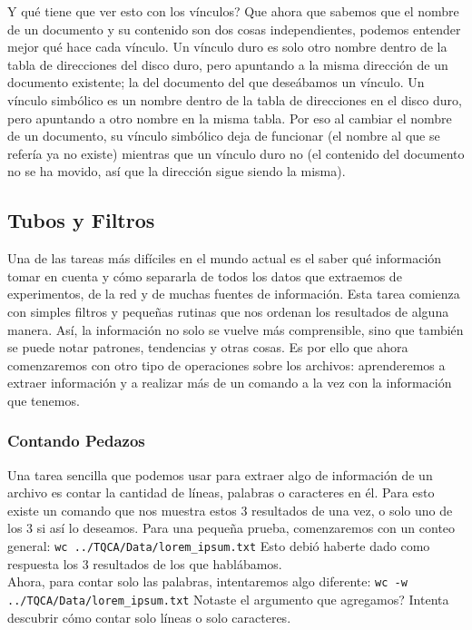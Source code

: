 \documentclass[10pt,letterpaper]{article}
\newcommand{\inlinecode}[1]{
\colorbox{light-gray}{\texttt{#1}}
}
\begin{document}
Y qu\'e tiene que ver esto con los v\'inculos? Que ahora que sabemos que el nombre de un documento y su contenido son dos cosas independientes, podemos entender mejor qu\'e hace cada v\'inculo. Un v\'inculo duro es solo otro nombre dentro de la tabla de direcciones del disco duro, pero apuntando a la misma direcci\'on de un documento existente; la del documento del que dese\'abamos un v\'inculo. Un v\'inculo simb\'olico es un nombre dentro de la tabla de direcciones en el disco duro, pero apuntando a otro nombre en la misma tabla. Por eso al cambiar el nombre de un documento, su v\'inculo simb\'olico deja de funcionar (el nombre al que se refer\'ia ya no existe) mientras que un v\'inculo duro no (el contenido del documento no se ha movido, as\'i que la direcci\'on sigue siendo la misma).

\subsection{Tubos y Filtros}
Una de las tareas m\'as dif\'iciles en el mundo actual es el saber qu\'e informaci\'on tomar en cuenta y c\'omo separarla de todos los datos que extraemos de experimentos, de la red y de muchas fuentes de informaci\'on. Esta tarea comienza con simples filtros y peque\~nas rutinas que nos ordenan los resultados de alguna manera. As\'i, la informaci\'on no solo se vuelve m\'as comprensible, sino que tambi\'en se puede notar patrones, tendencias y otras cosas. Es por ello que ahora comenzaremos con otro tipo de operaciones sobre los archivos: aprenderemos a extraer informaci\'on y a realizar m\'as de un comando a la vez con la informaci\'on que tenemos.

\subsubsection{Contando Pedazos}
Una tarea sencilla que podemos usar para extraer algo de informaci\'on de un archivo es contar la cantidad de l\'ineas, palabras o caracteres en \'el. Para esto existe un comando que nos muestra estos 3 resultados de una vez, o solo uno de los 3 si as\'i lo deseamos. Para una peque\~na prueba, comenzaremos con un conteo general: \inlinecode{wc ../TQCA/Data/lorem\_ipsum.txt} Esto debi\'o haberte dado como respuesta los 3 resultados de los que habl\'abamos.\\

Ahora, para contar solo las palabras, intentaremos algo diferente: \inlinecode{wc -w ../TQCA/Data/lorem\_ipsum.txt} Notaste el argumento que agregamos? Intenta descubrir c\'omo contar solo l\'ineas o solo caracteres.\\
\end{document}
